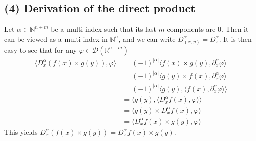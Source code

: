 \documentclass[11pt,a4paper]{article}
\newcommand{\ph}{\varphi}
\newcommand{\N}{\mathbb{N}}
\newcommand{\R}{\mathbb{R}}
\newcommand{\1}{\mathbbm{1}}
\begin{document}
\subsection*{(4) Derivation of the direct product}
Let $\alpha \in \N^{n+m}$ be a multi-index such that its last $m$ components are $0$. Then it can be viewed as a multi-index in $\N^n$, and we can write $D^\alpha_{(x,y)} = D^\alpha_x$. It is then easy to see that for any $\ph \in \mathcal{D}(\R^{n+m})$
\begin{align*}
\langle D^\alpha_x (f(x) \times g(y)) , \ph \rangle
& = (-1)^{|\alpha|} \langle f(x) \times g(y) , \partial^\alpha_x \ph \rangle \\
& = (-1)^{|\alpha|} \langle g(y) \times f(x) , \partial^\alpha_x \ph \rangle \\
& = (-1)^{|\alpha|} \langle g(y) , \langle f(x) , \partial^\alpha_x \ph \rangle \rangle \\
& = \langle g(y) , \langle D^\alpha_x f(x) , \ph \rangle \rangle \\
& = \langle g(y) \times D^\alpha_x f(x) , \ph \rangle \\
& = \langle D^\alpha_x f(x) \times g(y) , \ph \rangle 
\end{align*} 
This yields $D^\alpha_x (f(x) \times g(y)) = D^\alpha_x f(x) \times g(y)$.\newpage
\end{document}
